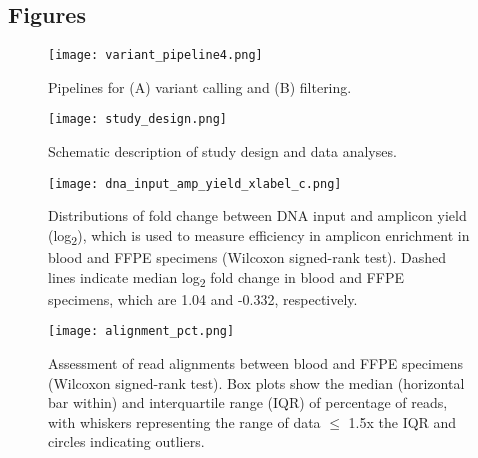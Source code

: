 \documentclass{bmcart}
\begin{document}
\begin{backmatter}


\section*{Figures}

\begin{figure}[!h]
\centering
	\texttt{[image: variant\_pipeline4.png]}
	\caption{Pipelines for (A) variant calling and (B) filtering.}
	\label{variant_pipeline}
\end{figure}

\begin{figure}[!h]
	\centering
	\texttt{[image: study\_design.png]}
	\caption{Schematic description of study design and data analyses.}
	\label{study_design}
\end{figure}

\begin{figure}[!h]
	\centering
	\texttt{[image: dna\_input\_amp\_yield\_xlabel\_c.png]}
	\caption{Distributions of fold change between DNA input and amplicon yield (log\textsubscript{2}), which is used to measure efficiency in amplicon enrichment in blood and FFPE specimens (Wilcoxon signed-rank test). Dashed lines indicate median log\textsubscript{2} fold change in blood and FFPE specimens, which are 1.04 and -0.332, respectively.}
	\label{dna_input_amp_yield}
\end{figure}

\begin{figure}[!h]
\centering
  \texttt{[image: alignment\_pct.png]}
  \caption[Assessment of read alignments between blood and FFPE specimens (Wilcoxon signed-rank test).]{Assessment of read alignments between blood and FFPE specimens (Wilcoxon signed-rank test). Box plots show the median (horizontal bar within) and interquartile range (IQR) of percentage of reads, with whiskers representing the range of data $\leq$ 1.5x the IQR and circles indicating outliers.}
  \label{alignment_pct}
\end{figure}


\end{backmatter}
\end{document}
